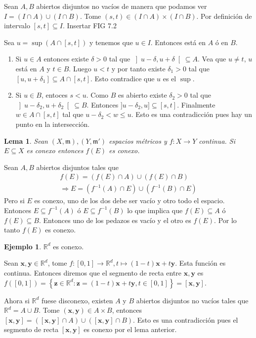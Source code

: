 \documentclass[12pt]{article}
\theoremstyle{plain}
\newtheorem{Lem}[Th]{Lema}             %
\theoremstyle{definition}
\newtheorem{Ex}[Th]{Ejemplo}               %
\theoremstyle{remark}
\numberwithin{equation}{section}
\newcommand{\bR}{\mathbb{R}}        %
\newcommand{\mm}{\mathfrak{m}}      %
\renewcommand{\leq}{\leqslant}      %
\renewcommand{\:}{\colon}           %
\renewcommand{\vec}[1]{\mathbf{#1}}
\newcommand{\vx}{\vec{x}}           %
\newcommand{\vy}{\vec{y}}
\newcommand{\vz}{\vec{z}}
\newcommand{\conj}[1]{\left\lbrace#1\right\rbrace}
\newcommand{\bonj}[1]{\left\lbrack#1\right\rbrack}
\newcommand{\obonj}[1]{\left\rbrack#1\right\lbrack}
\begin{document}
\begin{multicols}{2}
\begin{ptcb}
Sean $A,B$ abiertos disjuntos no vacíos de manera que podamos ver $I=(I\cap A)\cup(I\cap B)$. Tome $(s,t)\in(I\cap A)\times(I\cap B)$. Por definición de intervalo $\bonj{s,t}\subseteq I$.
Insertar FIG 7.2\par
Sea $u=\sup(A\cap\bonj{s,t})$ y tenemos que $u\in I$. Entonces está en $A$ ó en $B$.
\begin{enumerate}
  \item Si $u\in A$ entonces existe $\delta>0$ tal que $\obonj{u-\delta,u+\delta}\subseteq A$. Vea que $u\neq t$, $u$ está en $A$ y $t\in B$. Luego $u<t$ y por tanto existe $\delta_1>0$ tal que $\bonj{u,u+\delta_1}\subseteq A\cap\bonj{s,t}$. Esto contradice que $u$ es el $\sup$.
  \item Si $u\in B$, entoces $s<u$. Como $B$ es abierto existe $\delta_2>0$ tal que $\obonj{u-\delta_2,u+\delta_2}\subseteq B$. Entonces $\rbrack u-\delta_2, u\rbrack\subseteq \bonj{s,t}$. Finalmente $w\in A\cap \bonj{s,t}$ tal que $u-\delta_2<w\leq u$. Esto es una contradicción pues hay un punto en la intersección.
\end{enumerate}
\end{ptcb}

\begin{Lem}
  Sean $(X,\mm),(Y,\mm')$ espacios métricos y $f\colon X\to Y$ continua. Si $E\subseteq X$ es conexo entonces $f(E)$ es conexo.
\end{Lem}

\begin{ptcbp}
Sean $A,B$ abiertos disjuntos tales que
\begin{gather*}
  f(E)=(f(E)\cap A)\cup(f(E)\cap B) \\
  \Rightarrow E=(f^{-1}(A)\cap E)\cup(f^{-1}(B)\cap E)
\end{gather*}
Pero si $E$ es conexo, uno de los dos debe ser vacío y otro todo el espacio. Entonces $E\subseteq f^{-1}(A)$ ó $E\subseteq f^{-1}(B)$ lo que implica que $f(E)\subseteq A$ ó $f(E)\subseteq B$. Entonces uno de los pedazos es vacío y el otro es $f(E)$. Por lo tanto $f(E)$ es conexo.

\end{ptcbp}

\begin{Ex}
  $\bR^d$ es conexo.
\end{Ex}

\begin{ptcb}
Sean $\vx,\vy\in\bR^d$, tome $f\colon\bonj{0,1}\to\bR^d, t\mapsto (1-t)\vx+t\vy$. Esta función es continua. Entonces diremos que el segmento de recta entre $\vx,\vy$ es $f(\bonj{0,1})=\conj{\vz\in\bR^d\colon \vz=(1-t)\vx+t\vy, t\in\bonj{0,1}}=\bonj{\vx,\vy}$. \par
Ahora si $\bR^d$ fuese disconexo, existen $A$ y $B$ abiertos disjuntos no vacíos tales que $\bR^d=A\cup B$. Tome $(\vx,\vy)\in A\times B$, entonces $\bonj{\vx,\vy}=(\bonj{\vx,\vy}\cap A)\cup (\bonj{\vx,\vy}\cap B)$. Esto es una contradicción pues el segmento de recta $\bonj{\vx,\vy}$ es conexo por el lema anterior.
\end{ptcb}


\end{multicols}
\end{document}
